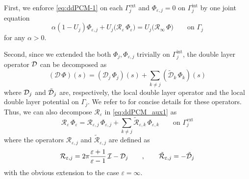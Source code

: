First, we enforce \eqref{eq:ddPCM-1} on each $\Gamma_j^\text{ext}$ and $\Phi_{\varepsilon,j}=0$ on $\Gamma_j^\text{int}$ by one joint equation
\begin{equation}
	\label{eq:ddPCM_aux1}
	\alpha(1 - U_j)\Phi_{\varepsilon,j} + U_j \bigg( {\mathcal{R}}_{\varepsilon} \, \Phi_{\varepsilon} \bigg) = U_j \bigg( {\mathcal{R}}_{\infty} \, \Phi \bigg)\qquad \text{on }\Gamma_j
\end{equation}
for any $\alpha>0$.

Second, since we extended the both $\Phi_j , \Phi_{\varepsilon,j}$ trivially on $\Gamma_j^\text{int}$, the double layer operator $\mathcal{D}$ can be decomposed as
\[
(\mathcal{D} \, \Phi ) (s) = ( \mathcal{D}_j \, \Phi_j )(s) + \sum_{k \ne j} (\tilde{\mathcal{D}}_k \, \Phi_k )(s) 
\]
where $\mathcal{D}_j$ and $\tilde{\mathcal{D}}_j$ are, respectively, the local double layer operator and the local double layer potential on $\Gamma_j$. 
We refer to\cite{Stamm_JCP_DDPCM} for concise details for these operators.
Thus, we can also decompose ${\mathcal{R}}_{\varepsilon}$ in \eqref{eq:ddPCM_aux1} as
\begin{equation}\label{eq:PCM_aux2}
{\mathcal{R}}_{\varepsilon} \, \Phi_{\varepsilon}
=
{\mathcal{R}}_{\varepsilon,j} \, \Phi_{\varepsilon,j} + \sum_{k \ne j} \tilde{\mathcal{R}}_{\varepsilon,k} \, \Phi_{\varepsilon,k} 
\qquad \text{on }\Gamma_j^\text{ext}
\end{equation}
where the operators ${\mathcal{R}}_{\varepsilon,j}$ and $\tilde{\mathcal{R}}_{\varepsilon,j}$ are defined as
\[
{\mathcal{R}}_{\varepsilon,j} = 2 \pi \frac{\varepsilon + 1}{\varepsilon - 1} \, \mathcal{I} - {\mathcal{D}}_j  \qquad, \qquad
\tilde{\mathcal{R}}_{\varepsilon,j} =  - \tilde{\mathcal{D}}_j
\]
with the obvious extension to the case $\varepsilon = \infty$. 
%

